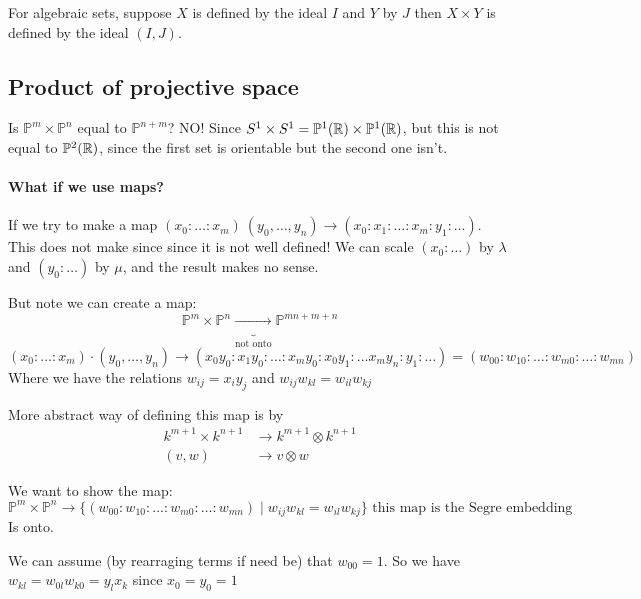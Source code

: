 For algebraic sets, suppose $X$ is defined by the ideal $I$ and $Y$ by $J$ then $X\times Y$ is defined by the ideal $(I,J)$.


\subsection{Product of projective space}

Is $\mathbb{P}^m\times \mathbb{P}^n$ equal to $\mathbb{P}^{n+m}$? NO! Since $S^1\times S^1 = \mathbb{P}^1(\mathbb{R})\times \mathbb{P}^1(\mathbb{R})$, but this is not equal to $\mathbb{P}^2(\mathbb{R})$, since the first set is orientable but the second one isn't.

\paragraph*{What if we use maps?}

If we try to make a map $(x_0\colon \ldots\colon x_m) \ (y_0,\ldots, y_n) \rightarrow (x_0\colon x_1\colon \ldots\colon x_m \colon y_1\colon \ldots)$. This does not make since since it is not well defined! We can scale $(x_0\colon \ldots)$ by $\lambda$ and $(y_0\colon \ldots)$ by $\mu$, and the result makes no sense.

But note we can create a map: \[\mathbb{P}^m\times \mathbb{P}^n \underbrace{\rightarrow}_{\text{not onto}} \mathbb{P}^{mn+m+n}\]
\[(x_0\colon \ldots\colon x_m) \cdot (y_0,\ldots, y_n) \rightarrow (x_0y_0\colon x_1y_0\colon \ldots\colon x_my_0 \colon x_0y_1\colon \ldots x_my_n \colon y_1\colon \ldots) = (w_{00}\colon w_{10}\colon \ldots \colon w_{m0}\colon \ldots \colon w_{mn})\] Where we have the relations $w_{ij} = x_iy_j$ and $w_{ij}w_{kl} = w_{il}w_{kj}$

\begin{remark}
    More abstract way of defining this map is by \begin{align*}
        k^{m+1} \times k^{n+1} &\rightarrow k^{m+1} \otimes k^{n+1}\\
        (v,w) &\rightarrow v\otimes w
    \end{align*} 
\end{remark}

We want to show the map: \[\mathbb{P}^m\times \mathbb{P}^n \rightarrow \{(w_{00}\colon w_{10}\colon \ldots \colon w_{m0}\colon \ldots \colon w_{mn}) \mid w_{ij}w_{kl} = w_{il}w_{kj}\}\text{ this map is the Segre embedding} \] Is onto.

We can assume (by rearraging terms if need be) that $w_{00} = 1$. So we have $w_{kl} = w_{0l}w_{k0} = y_lx_k$ since $x_0=y_0 =1$

